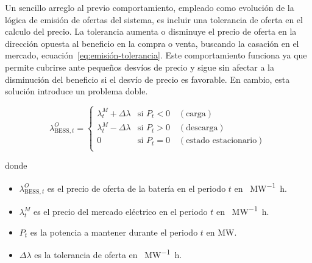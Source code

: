   Un sencillo arreglo al previo comportamiento, empleado como evolución de la lógica de emisión de ofertas del sistema, es incluir una tolerancia de oferta en el calculo del precio. La tolerancia aumenta o disminuye el precio de oferta en la dirección opuesta al beneficio en la compra o venta, buscando la casación en el mercado, ecuación~\ref{eq:emisión-tolerancia}. Este comportamiento funciona ya que permite cubrirse ante pequeños desvíos de precio y sigue sin afectar a la disminución del beneficio si el desvío de precio es favorable. En cambio, esta solución introduce un problema doble.

  \begin{samepage}

    \begin{equation}
      \label{eq:emisión-tolerancia}
      \lambda^{O}_{\text{BESS}, t} =
      \begin{cases}
        \lambda^{M}_{t} + \Delta \lambda & \text{si } P_{t} < 0 \quad (\text{carga})       \\
        \lambda^{M}_{t} - \Delta \lambda & \text{si } P_{t} > 0 \quad (\text{descarga})    \\
        0                                & \text{si } P_{t} = 0 \quad (\text{estado estacionario}) \\
      \end{cases}
    \end{equation}

    donde

    \begin{itemize}

      \item \( \lambda^{O}_{\text{BESS}, t} \) es el precio de oferta de la batería en el periodo \( t \) en \si{\text{\euro}\per\mega\watt\hour}.

      \item \( \lambda^{M}_{t} \) es el precio del mercado eléctrico en el periodo \( t \) en \si{\text{\euro}\per\mega\watt\hour}.

      \item \( P_{t} \) es la potencia a mantener durante el periodo \( t \) en \si{\mega\watt}.

      \item \( \Delta \lambda \) es la tolerancia de oferta en \si{\text{\euro}\per\mega\watt\hour}.

    \end{itemize}

  \end{samepage}

